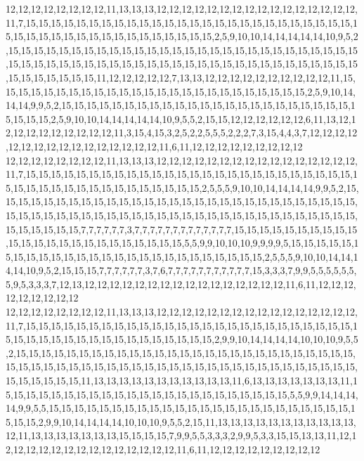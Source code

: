 12,12,12,12,12,12,12,12,11,13,13,13,12,12,12,12,12,12,12,12,12,12,12,12,12,12,12,12,11,7,15,15,15,15,15,15,15,15,15,15,15,15,15,15,15,15,15,15,15,15,15,15,15,15,15,15,15,15,15,15,15,15,15,15,15,15,15,15,15,15,15,15,15,2,5,9,10,10,14,14,14,14,14,10,9,5,2,15,15,15,15,15,15,15,15,15,15,15,15,15,15,15,15,15,15,15,15,15,15,15,15,15,15,15,15,15,15,15,15,15,15,15,15,15,15,15,15,15,15,15,15,15,15,15,15,15,15,15,15,15,15,15,15,15,15,15,15,15,15,15,11,12,12,12,12,12,7,13,13,12,12,12,12,12,12,12,12,12,12,11,15,15,15,15,15,15,15,15,15,15,15,15,15,15,15,15,15,15,15,15,15,15,15,15,15,2,5,9,10,14,14,14,9,9,5,2,15,15,15,15,15,15,15,15,15,15,15,15,15,15,15,15,15,15,15,15,15,15,15,15,15,15,15,2,5,9,10,10,14,14,14,14,14,10,9,5,5,2,15,15,12,12,12,12,12,12,6,11,13,12,12,12,12,12,12,12,12,12,12,11,3,15,4,15,3,2,5,2,2,5,5,5,2,2,2,7,3,15,4,4,3,7,12,12,12,12,12,12,12,12,12,12,12,12,12,12,12,12,11,6,11,12,12,12,12,12,12,12,12,12
12,12,12,12,12,12,12,12,11,13,13,13,12,12,12,12,12,12,12,12,12,12,12,12,12,12,12,12,11,7,15,15,15,15,15,15,15,15,15,15,15,15,15,15,15,15,15,15,15,15,15,15,15,15,15,15,15,15,15,15,15,15,15,15,15,15,15,15,15,15,15,15,2,5,5,5,9,10,10,14,14,14,14,9,9,5,2,15,15,15,15,15,15,15,15,15,15,15,15,15,15,15,15,15,15,15,15,15,15,15,15,15,15,15,15,15,15,15,15,15,15,15,15,15,15,15,15,15,15,15,15,15,15,15,15,15,15,15,15,15,15,15,15,15,15,15,15,15,15,15,7,7,7,7,7,7,3,7,7,7,7,7,7,7,7,7,7,7,7,7,15,15,15,15,15,15,15,15,15,15,15,15,15,15,15,15,15,15,15,15,15,15,15,15,5,5,9,9,10,10,10,9,9,9,9,5,15,15,15,15,15,15,15,15,15,15,15,15,15,15,15,15,15,15,15,15,15,15,15,15,15,15,2,5,5,5,9,10,10,14,14,14,14,10,9,5,2,15,15,15,7,7,7,7,7,7,3,7,6,7,7,7,7,7,7,7,7,7,7,7,15,3,3,3,7,9,9,5,5,5,5,5,5,5,9,5,3,3,3,7,12,13,12,12,12,12,12,12,12,12,12,12,12,12,12,12,12,12,11,6,11,12,12,12,12,12,12,12,12,12
12,12,12,12,12,12,12,12,11,13,13,13,12,12,12,12,12,12,12,12,12,12,12,12,12,12,12,12,11,7,15,15,15,15,15,15,15,15,15,15,15,15,15,15,15,15,15,15,15,15,15,15,15,15,15,15,15,15,15,15,15,15,15,15,15,15,15,15,15,15,15,15,15,2,9,9,10,14,14,14,14,10,10,10,9,5,5,2,15,15,15,15,15,15,15,15,15,15,15,15,15,15,15,15,15,15,15,15,15,15,15,15,15,15,15,15,15,15,15,15,15,15,15,15,15,15,15,15,15,15,15,15,15,15,15,15,15,15,15,15,15,15,15,15,15,15,15,15,15,11,13,13,13,13,13,13,13,13,13,13,13,11,6,13,13,13,13,13,13,13,11,15,15,15,15,15,15,15,15,15,15,15,15,15,15,15,15,15,15,15,15,15,15,15,5,5,9,9,14,14,14,14,9,9,5,5,15,15,15,15,15,15,15,15,15,15,15,15,15,15,15,15,15,15,15,15,15,15,15,15,15,15,15,2,9,9,10,14,14,14,14,10,10,10,9,5,5,2,15,11,13,13,13,13,13,13,13,13,13,13,13,12,11,13,13,13,13,13,13,13,15,15,15,15,7,9,9,5,5,3,3,3,2,9,9,5,3,3,15,15,13,13,11,12,12,12,12,12,12,12,12,12,12,12,12,12,12,12,11,6,11,12,12,12,12,12,12,12,12,12
